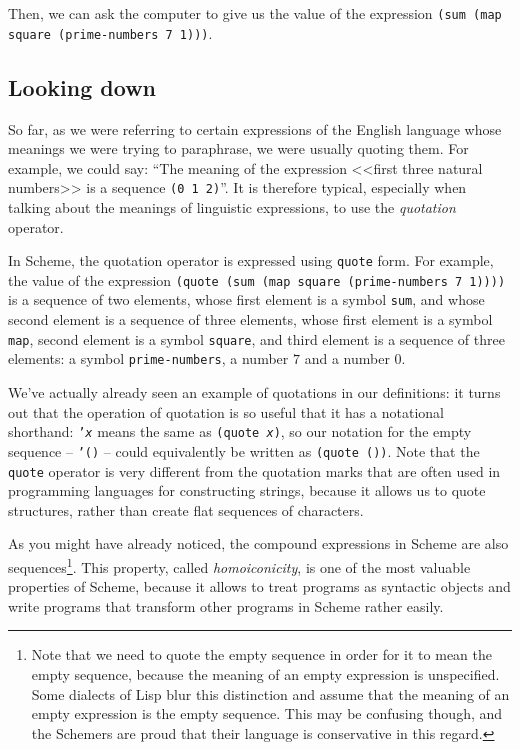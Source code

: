 Then, we can ask the computer to give us the value of the
expression \texttt{(sum (map square (prime-numbers 7 1)))}.

\subsection{Looking down}

So far, as we were referring to certain expressions of the English
language whose meanings we were trying to paraphrase, we were usually
quoting them. For example, we could say: ``The meaning
of the expression <<first three natural numbers>> is a sequence
\texttt{(0 1 2)}''. It is therefore typical, especially when
talking about the meanings of linguistic expressions, to use
the \textit{quotation} operator.

In Scheme, the quotation operator is expressed using
\texttt{quote} form. For example, the value of the expression
\texttt{(quote (sum (map square (prime\--numbers 7 1))))}
is a sequence of two elements, whose first element is
a symbol \texttt{sum}, and whose second element is a sequence
of three elements, whose first element is a symbol \texttt{map},
second element is a symbol \texttt{square}, and third element
is a sequence of three elements: a symbol \texttt{prime-numbers},
a number $7$ and a number $0$.

We've actually already seen an example of quotations in our
definitions: it turns out that the operation of quotation is
so useful that it has a notational shorthand: \texttt{'\textit{x}}
means the same as \texttt{(quote \textit{x})}, so our notation
for the empty sequence -- \texttt{'()} -- could equivalently
be written as \texttt{(quote ())}. Note that the \texttt{quote}
operator is very different from the quotation marks that are
often used in programming languages for constructing strings,
because it allows us to quote structures, rather than create
flat sequences of characters.

As you might have already noticed, the compound expressions
in Scheme are also sequences\footnote{Note that we need to quote
the empty sequence in order for it to mean the empty sequence,
because the meaning of an empty expression is unspecified.
Some dialects of Lisp blur this distinction and assume that
the meaning of an empty expression is the empty sequence.
This may be confusing though, and the Schemers are proud that
their language is conservative in this regard.}.
This property, called \textit{homoiconicity},
is one of the most valuable properties of Scheme, because it
allows to treat programs as syntactic objects and write programs
that transform other programs in Scheme rather easily.

